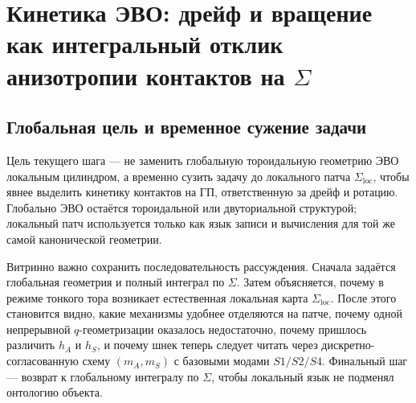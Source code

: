 %
%
%

\section{Кинетика ЭВО: дрейф и вращение как интегральный отклик анизотропии контактов на \(\Sigma\)}

\subsection{Глобальная цель и временное сужение задачи}

Цель текущего шага --- не заменить глобальную тороидальную геометрию ЭВО локальным цилиндром, а временно сузить задачу до локального патча \(\Sigma_{\mathrm{loc}}\), чтобы явнее выделить кинетику контактов на ГП, ответственную за дрейф и ротацию. Глобально ЭВО остаётся тороидальной или двуториальной структурой; локальный патч используется только как язык записи и вычисления для той же самой канонической геометрии.

Витринно важно сохранить последовательность рассуждения. Сначала задаётся глобальная геометрия и полный интеграл по \(\Sigma\). Затем объясняется, почему в режиме тонкого тора возникает естественная локальная карта \(\Sigma_{\mathrm{loc}}\). После этого становится видно, какие механизмы удобнее отделяются на патче, почему одной непрерывной \(q\)-геометризации оказалось недостаточно, почему пришлось различить \(h_A\) и \(h_S\), и почему шнек теперь следует читать через дискретно-согласованную схему \((m_A,m_S)\) с базовыми модами \(S1/S2/S4\). Финальный шаг --- возврат к глобальному интегралу по \(\Sigma\), чтобы локальный язык не подменял онтологию объекта.

